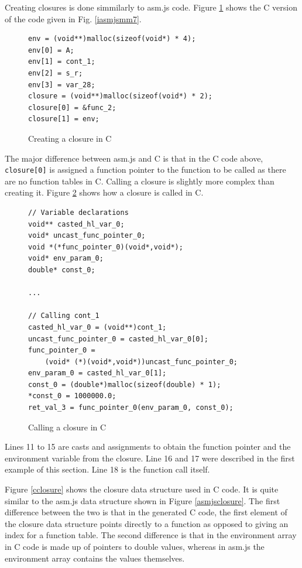 \documentclass[11pt]{report}
\begin{document}
Creating closures is done simmilarly to asm.js code. Figure \ref{icmm2} shows the C version of the code given in Fig. \ref{iasmjsmm7}.

\begin{figure}[ht]
\begin{lstlisting}
env = (void**)malloc(sizeof(void*) * 4);
env[0] = A;
env[1] = cont_1;
env[2] = s_r;
env[3] = var_28;
closure = (void**)malloc(sizeof(void*) * 2);
closure[0] = &func_2;
closure[1] = env;
\end{lstlisting}
\caption{Creating a closure in C}
\label{icmm2}
\end{figure}

The major difference between asm.js and C is that in the C code above, \texttt{closure[0]} is assigned a function pointer to the function to be called as there are no function tables in C. Calling a closure is slightly more complex than creating it. Figure \ref{icmm3} shows how a closure is called in C.

\begin{figure}[ht]
\begin{lstlisting}
// Variable declarations
void** casted_hl_var_0;
void* uncast_func_pointer_0;
void *(*func_pointer_0)(void*,void*);
void* env_param_0;
double* const_0;

...

// Calling cont_1
casted_hl_var_0 = (void**)cont_1;
uncast_func_pointer_0 = casted_hl_var_0[0];
func_pointer_0 = 
    (void* (*)(void*,void*))uncast_func_pointer_0;
env_param_0 = casted_hl_var_0[1];
const_0 = (double*)malloc(sizeof(double) * 1);
*const_0 = 1000000.0;
ret_val_3 = func_pointer_0(env_param_0, const_0);
\end{lstlisting}
\caption{Calling a closure in C}
\label{icmm3}
\end{figure}

Lines 11 to 15 are casts and assignments to obtain the function pointer and the environment variable from the closure. Line 16 and 17 were described in the first example of this section. Line 18 is the function call itself.

Figure \ref{cclosure} shows the closure data structure used in C code. It is quite similar to the asm.js data structure shown in Figure \ref{asmjsclosure}. The first difference between the two is that in the generated C code, the first element of the closure data structure points directly to a function as opposed to giving an index for a function table. The second difference is that in the environment array in C code is made up of pointers to double values, whereas in asm.js the environment array contains the values themselves.
\end{document}
